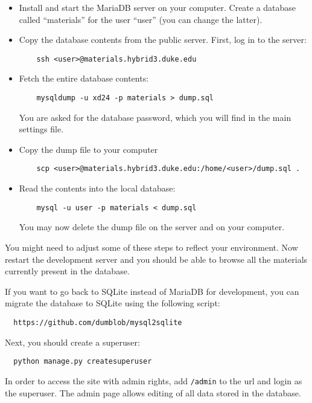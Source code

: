 \documentclass{article}
\begin{document}
\begin{itemize}
\item Install and start the MariaDB server on your computer. Create a database called ``materials'' for the user ``user'' (you can change the latter).
\item Copy the database contents from the public server. First, log in to the server:
  \begin{lstlisting}
    ssh <user>@materials.hybrid3.duke.edu
  \end{lstlisting}
\item Fetch the entire database contents:
  \begin{lstlisting}
    mysqldump -u xd24 -p materials > dump.sql
  \end{lstlisting}
  You are asked for the database password, which you will find in the main settings file.
\item Copy the dump file to your computer
  \begin{lstlisting}
    scp <user>@materials.hybrid3.duke.edu:/home/<user>/dump.sql .
  \end{lstlisting}
\item Read the contents into the local database:
  \begin{lstlisting}
    mysql -u user -p materials < dump.sql
  \end{lstlisting}
  You may now delete the dump file on the server and on your computer.
\end{itemize}
You might need to adjust some of these steps to reflect your environment. Now restart the development server and you should be able to browse all the materials currently present in the database.

If you want to go back to SQLite instead of MariaDB for development, you can migrate the database to SQLite using the following script:
\begin{verbatim}
  https://github.com/dumblob/mysql2sqlite
\end{verbatim}

Next, you should create a superuser:
\begin{lstlisting}
  python manage.py createsuperuser
\end{lstlisting}
In order to access the site with admin rights, add \verb+/admin+ to the url and login as the superuser. The admin page allows editing of all data stored in the database.
\end{document}
